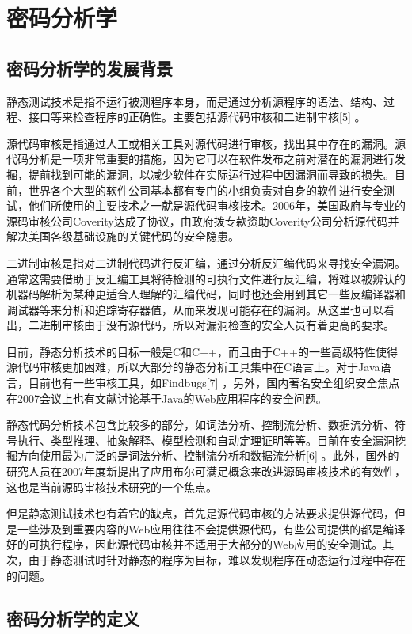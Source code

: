 \chapter{密码分析学}
\section{密码分析学的发展背景}
{ 静态测试技术是指不运行被测程序本身，而是通过分析源程序的语法、结构、过程、接口等来检查程序的正确性。主要包括源代码审核和二进制审核[5] 。

源代码审核是指通过人工或相关工具对源代码进行审核，找出其中存在的漏洞。源代码分析是一项非常重要的措施，因为它可以在软件发布之前对潜在的漏洞进行发掘，提前找到可能的漏洞，以减少软件在实际运行过程中因漏洞而导致的损失。目前，世界各个大型的软件公司基本都有专门的小组负责对自身的软件进行安全测试，他们所使用的主要技术之一就是源代码审核技术。2006年，美国政府与专业的源码审核公司Coverity达成了协议，由政府拨专款资助Coverity公司分析源代码并解决美国各级基础设施的关键代码的安全隐患。

二进制审核是指对二进制代码进行反汇编，通过分析反汇编代码来寻找安全漏洞。通常这需要借助于反汇编工具将待检测的可执行文件进行反汇编，将难以被辨认的机器码解析为某种更适合人理解的汇编代码，同时也还会用到其它一些反编译器和调试器等来分析和追踪寄存器值，从而来发现可能存在的漏洞。从这里也可以看出，二进制审核由于没有源代码，所以对漏洞检查的安全人员有着更高的要求。

目前，静态分析技术的目标一般是C和C++，而且由于C++的一些高级特性使得源代码审核更加困难，所以大部分的静态分析工具集中在C语言上。对于Java语言，目前也有一些审核工具，如Findbugs[7] ，另外，国内著名安全组织安全焦点在2007会议上也有文献讨论基于Java的Web应用程序的安全问题。

静态代码分析技术包含比较多的部分，如词法分析、控制流分析、数据流分析、符号执行、类型推理、抽象解释、模型检测和自动定理证明等等。目前在安全漏洞挖掘方向使用最为广泛的是词法分析、控制流分析和数据流分析[6] 。此外，国外的研究人员在2007年度新提出了应用布尔可满足概念来改进源码审核技术的有效性，这也是当前源码审核技术研究的一个焦点。

但是静态测试技术也有着它的缺点，首先是源代码审核的方法要求提供源代码，但是一些涉及到重要内容的Web应用往往不会提供源代码，有些公司提供的都是编译好的可执行程序，因此源代码审核并不适用于大部分的Web应用的安全测试。其次，由于静态测试时针对静态的程序为目标，难以发现程序在动态运行过程中存在的问题。

}
\section{密码分析学的定义}
